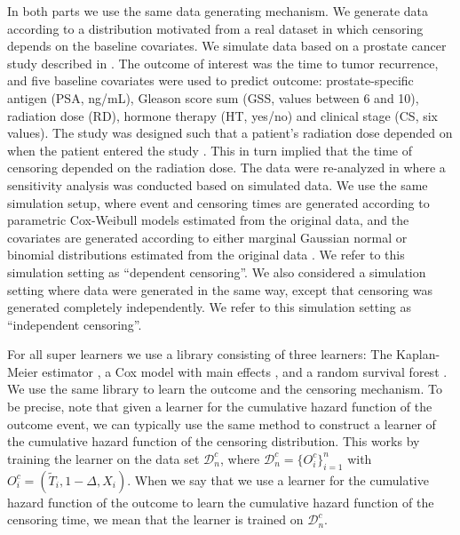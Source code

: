 \documentclass[unnumsec,webpdf,contemporary,large,namedate]{oup-authoring-template}%
\theoremstyle{thmstyleone}%
\theoremstyle{thmstyletwo}%
\theoremstyle{thmstylethree}%
\newcommand{\1}{\mathds{1}}
\newcommand{\data}{\ensuremath{\mathcal{D}}}
\begin{document}
In both parts we use the same data generating mechanism. We generate
data according to a distribution motivated from a real dataset in
which censoring depends on the baseline covariates. We simulate data
based on a prostate cancer study described in
\citep{kattan2000pretreatment}. The outcome of interest was the time
to tumor recurrence, and five baseline covariates were used to predict
outcome: prostate-specific antigen (PSA, ng/mL), Gleason score sum
(GSS, values between 6 and 10), radiation dose (RD), hormone therapy
(HT, yes/no) and clinical stage (CS, six values). The study was
designed such that a patient's radiation dose depended on when the
patient entered the study \citep{gerds2013estimating}. This in turn
implied that the time of censoring depended on the radiation dose. The
data were re-analyzed in \citep{gerds2013estimating} where a
sensitivity analysis was conducted based on simulated data. We use the
same simulation setup, where event and censoring times are generated
according to parametric Cox-Weibull models estimated from the original
data, and the covariates are generated according to either marginal
Gaussian normal or binomial distributions estimated from the original
data \citep[c.f.,][Section~4.6]{gerds2013estimating}. We refer to this
simulation setting as ``dependent censoring''. We also considered a
simulation setting where data were generated in the same way, except
that censoring was generated completely independently. We refer to
this simulation setting as ``independent censoring''.

For all super learners we use a library consisting of three learners: The
Kaplan-Meier estimator \citep{kaplan1958nonparametric,Gerds_2019prodlim}, a Cox
model with main effects \citep{cox1972regression, survival-package}, and a
random survival forest \citep{ishwaran2008random,rfsrc-paclage}. We use the same
library to learn the outcome and the censoring mechanism. To be precise, note
that given a learner for the cumulative hazard function of the outcome event, we
can typically use the same method to construct a learner of the cumulative
hazard function of the censoring distribution. This works by training the
learner on the data set \( \data_n^c \), where
\( \data_n^c = \{O_i^c\}_{i=1}^n \) with
\( O_i^c = (\tilde{T}_i, 1-\Delta, X_i) \). When we say that we use a learner
for the cumulative hazard function of the outcome to learn the cumulative hazard
function of the censoring time, we mean that the learner is trained on
\( \data_n^c \).
\end{document}
